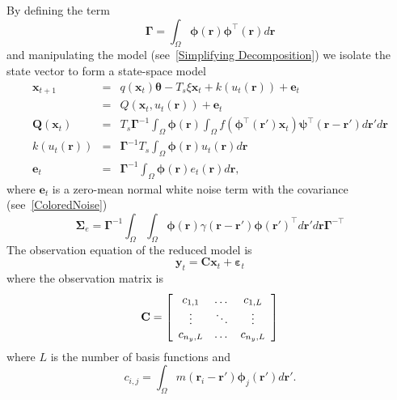 \documentclass[12pt]{iopart}
\begin{document}
By defining the term 
\begin{equation}
	\label{DefGamma} \boldsymbol{\Gamma} = \int_\Omega {\boldsymbol{\phi} \left(\mathbf{r}\right)\boldsymbol{\phi} ^{\top}\left(\mathbf{r}\right)d\mathbf{r}} 
\end{equation}
and manipulating the model (see~\ref{Simplifying Decomposition}) we isolate the state vector to form a state-space model 
\begin{eqnarray}
	\label{Homogeneous SS Model} \mathbf{x}_{t+1} &=& q(\mathbf{x}_t)\boldsymbol{\theta} - T_s\xi\mathbf{x}_t + k\left(u_t\left(\mathbf{r}\right)\right) + \mathbf{e}_t \\
	&=& Q\left(\mathbf{x}_t,u_t(\mathbf{r})\right) + \mathbf{e}_t \\
	\mathbf{Q}\left(\mathbf{x}_t\right) &=& T_s\boldsymbol{\Gamma}^{ - 1}\int_\Omega {\boldsymbol{\phi}\left(\mathbf{r}\right) \int_\Omega {f\left(\boldsymbol{\phi}^{\top}\left(\mathbf{r}'\right)\mathbf{x}_t\right)\boldsymbol{\psi}^{\top} \left(\mathbf{r}-\mathbf{r}'\right)d\mathbf{r}'} d\mathbf{r}} \\
	k(u_t(\mathbf{r})) &=& \boldsymbol{\Gamma}^{-1}T_s \int_\Omega{\boldsymbol{\phi} \left(\mathbf{r}\right) u_t\left(\mathbf{r}\right)d\mathbf{r}} \\
	\mathbf{e}_t &=& \boldsymbol{\Gamma}^{-1}\int_\Omega{\boldsymbol{\phi}\left(\mathbf{r}\right)e_t\left(\mathbf{r}\right)d\mathbf{r}}, 
\end{eqnarray}
where $\mathbf{e}_t$ is a zero-mean normal white noise term with the covariance (see~\ref{ColoredNoise}) 
\begin{equation}
	\boldsymbol{\Sigma}_e=\boldsymbol{\Gamma}^{-1}\int_{\Omega}\int_{\Omega}\boldsymbol{\phi}\left(\mathbf r\right) \gamma\left(\mathbf{r}- \mathbf{r}' \right)\boldsymbol{\phi}\left(\mathbf{r}'\right)^{\top}d\mathbf{r}' d\mathbf{r}\boldsymbol{\Gamma}^{- \top} 
\end{equation}
The observation equation of the reduced model is 
\begin{equation}
	\label{ObservationEquation} \mathbf{y}_t = \mathbf{C}\mathbf{x}_t + \boldsymbol{\varepsilon}_t 
\end{equation}
where the observation matrix is 
\begin{equation}
	\mathbf{C} = \left[
	\begin{array}{{ccc}} 
		c_{1,1} & \dots & c_{1,L} \\
		\vdots & \ddots & \vdots \\
		c_{n_y,L} & \dots & c_{n_y,L} 
	\end{array}
	\right] 
\end{equation}
where $L$ is the number of basis functions and 
\begin{equation}
	c_{i,j} = \int_{\Omega}m(\mathbf{r}_i - \mathbf{r}')\boldsymbol{\phi}_j(\mathbf{r}')d\mathbf{r}'. 
\end{equation}
\end{document}
